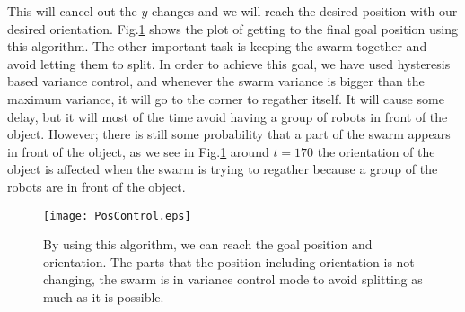 This will cancel out the $y$ changes and we will reach the desired position with our desired orientation. Fig.\ref{fig:PosControlFig} shows the plot of getting to the final goal position using this algorithm. The other important task is keeping the swarm together and avoid letting them to split. In order to achieve this goal, we have used hysteresis based variance control, and whenever the swarm variance is bigger than the maximum variance, it will go to the corner to regather itself. It will cause some delay, but it will most of the time avoid having a group of robots in front of the object. However; there is still some probability that a part of the swarm appears in front of the object, as we see in Fig.\ref{fig:PosControlFig} around $t=170$ the orientation of the object is affected when the swarm is trying to regather because a group of the robots are in front of the object. 

\begin{figure}
\begin{center}
	\texttt{[image: PosControl.eps]}
\end{center}
\vspace{-1em}
\caption{\label{fig:PosControlFig}
By using this algorithm, we can reach the goal position and orientation. The parts that the position including orientation is not changing, the swarm is in variance control mode to avoid splitting as much as it is possible. 
}
\vspace{-1em}
\end{figure}


